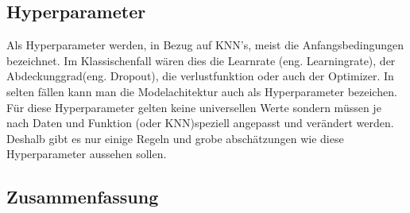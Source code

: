 \subsection{Hyperparameter}
Als Hyperparameter werden, in Bezug auf KNN's, meist die Anfangsbedingungen bezeichnet. Im Klassischenfall wären dies die Learnrate (eng. Learningrate), der Abdeckunggrad(eng. Dropout), die verlustfunktion oder auch der Optimizer. In selten fällen kann man die Modelachitektur auch als Hyperparameter bezeichen. Für diese Hyperparameter gelten keine universellen Werte sondern müssen je nach Daten und Funktion (oder KNN)speziell angepasst und verändert werden. Deshalb gibt es nur einige Regeln und grobe abschätzungen wie diese Hyperparameter aussehen sollen. 

\subsection{Zusammenfassung}